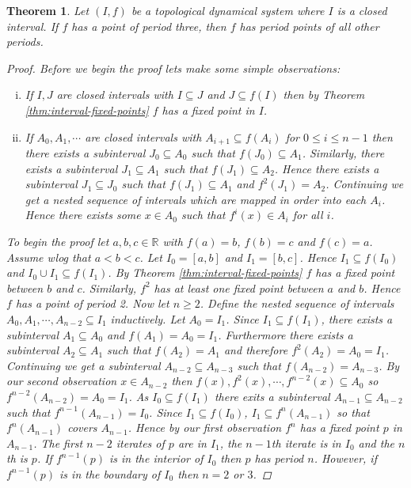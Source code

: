 \documentclass[11pt,a4paper,oneside]{memoir}
\theoremstyle{plain}
\newtheorem{thm}{Theorem}[chapter]
\theoremstyle{definition}
\begin{document}
\begin{thm}\label{thm:period3chaos}
    Let $(I, f)$ be a topological dynamical system where $I$ is a closed interval. If $f$ has a point of period three, then $f$ has period points of all other periods.
    \begin{proof}
        Before we begin the proof lets make some simple observations:
        \begin{enumerate}[(i)]
            \item If $I, J$ are closed intervals with $I \subseteq J$ and $J \subseteq f(I)$ then by Theorem \ref{thm:interval-fixed-points} $f$ has a fixed point in $I$.
            \item If $A_0, A_1, \cdots$ are closed intervals with $A_{i+1} \subseteq f(A_i)$ for $0 \leq i \leq n - 1$ then there exists a subinterval $J_0 \subseteq A_0$ such that $f(J_0) \subseteq A_1$. Similarly, there exists a subinterval $J_1 \subseteq A_1$ such that $f(J_1) \subseteq A_2$. Hence there exists a subinterval $J_1 \subseteq J_0$ such that $f(J_1) \subseteq A_1$ and $f^2(J_1) = A_2$. Continuing we get a nested sequence of intervals which are mapped in order into each $A_i$. Hence there exists some $x \in A_0$ such that $f^i(x) \in A_i$ for all $i$.
        \end{enumerate}
        To begin the proof let $a, b, c \in \mathbb{R}$ with $f(a) = b$, $f(b) = c$ and $f(c) = a$. Assume wlog that $a < b < c$. Let $I_0 = [a,b]$ and $I_1 = [b,c]$. Hence $I_1 \subseteq f(I_0)$ and $I_0 \cup I_1 \subseteq f(I_1)$. By Theorem \ref{thm:interval-fixed-points} $f$ has a fixed point between $b$ and $c$. Similarly, $f^2$ has at least one fixed point between $a$ and $b$. Hence $f$ has a point of period 2. Now let $n \geq 2$. Define the nested sequence of intervals $A_0, A_1, \cdots, A_{n-2} \subseteq I_1$ inductively. Let $A_0 = I_1$. Since $I_1 \subseteq f(I_1)$, there exists a subinterval $A_1 \subseteq A_0$ and $f(A_1) = A_0 = I_1$. Furthermore there exists a subinterval $A_2 \subseteq A_1$ such that $f(A_2) = A_1$ and therefore $f^2(A_2) = A_0 = I_1$. Continuing we get a subinterval $A_{n-2} \subseteq A_{n-3}$ such that $f(A_{n-2}) = A_{n-3}$. By our second observation $x \in A_{n-2}$ then $f(x), f^2(x), \cdots, f^{n-2}(x) \subseteq A_0$ so $f^{n-2}(A_{n-2}) = A_0 = I_1$. As $I_0 \subseteq f(I_1)$ there exits a subinterval $A_{n-1} \subseteq A_{n-2}$ such that $f^{n-1}(A_{n-1}) = I_0$. Since $I_1 \subseteq f(I_0)$, $I_1 \subseteq f^n(A_{n-1})$ so that $f^n(A_{n-1})$ covers $A_{n-1}$. Hence by our first observation $f^n$ has a fixed point $p$ in $A_{n-1}$. The first $n-2$ iterates of $p$ are in $I_1$, the $n-1$th iterate is in $I_0$ and the $n$th is $p$. If $f^{n-1}(p)$ is in the interior of $I_0$ then $p$ has period $n$. However, if $f^{n-1}(p)$ is in the boundary of $I_0$ then $n = 2$ or $3$.
    \end{proof}


\end{thm}
\end{document}
